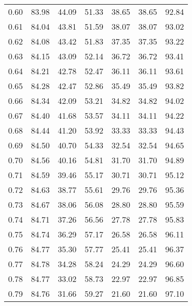 \begin{tabular}{|c|c|c|c|c|c|c|}
      0.60 &     83.98 &     44.09 &      51.33 &   38.65 &      38.65 &         92.84 \\
      0.61 &     84.04 &     43.81 &      51.59 &   38.07 &      38.07 &         93.02 \\
      0.62 &     84.08 &     43.42 &      51.83 &   37.35 &      37.35 &         93.22 \\
      0.63 &     84.15 &     43.09 &      52.14 &   36.72 &      36.72 &         93.41 \\
      0.64 &     84.21 &     42.78 &      52.47 &   36.11 &      36.11 &         93.61 \\
      0.65 &     84.28 &     42.47 &      52.86 &   35.49 &      35.49 &         93.82 \\
      0.66 &     84.34 &     42.09 &      53.21 &   34.82 &      34.82 &         94.02 \\
      0.67 &     84.40 &     41.68 &      53.57 &   34.11 &      34.11 &         94.22 \\
      0.68 &     84.44 &     41.20 &      53.92 &   33.33 &      33.33 &         94.43 \\
      0.69 &     84.50 &     40.70 &      54.33 &   32.54 &      32.54 &         94.65 \\
      0.70 &     84.56 &     40.16 &      54.81 &   31.70 &      31.70 &         94.89 \\
      0.71 &     84.59 &     39.46 &      55.17 &   30.71 &      30.71 &         95.12 \\
      0.72 &     84.63 &     38.77 &      55.61 &   29.76 &      29.76 &         95.36 \\
      0.73 &     84.67 &     38.06 &      56.08 &   28.80 &      28.80 &         95.59 \\
      0.74 &     84.71 &     37.26 &      56.56 &   27.78 &      27.78 &         95.83 \\
      0.75 &     84.74 &     36.29 &      57.17 &   26.58 &      26.58 &         96.11 \\
      0.76 &     84.77 &     35.30 &      57.77 &   25.41 &      25.41 &         96.37 \\
      0.77 &     84.78 &     34.28 &      58.24 &   24.29 &      24.29 &         96.60 \\
      0.78 &     84.77 &     33.02 &      58.73 &   22.97 &      22.97 &         96.85 \\
      0.79 &     84.76 &     31.66 &      59.27 &   21.60 &      21.60 &         97.10 \\

\end{tabular}
